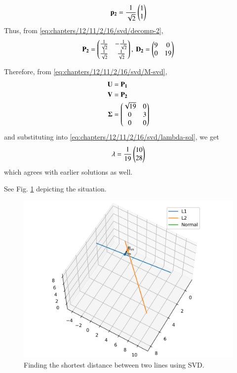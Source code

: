 \begin{enumerate}
        \begin{align}
            \mathbf{p_2} = \frac{1}{\sqrt{2}}\begin{pmatrix}1\\1\end{pmatrix}
        \end{align}
        Thus, from \eqref{eq:chapters/12/11/2/16/svd/decomp-2},
        \begin{align}
            \vec{P_2} = \myvec{\frac{1}{\sqrt{2}}&-\frac{1}{\sqrt{2}}\\\frac{1}{\sqrt{2}}&\frac{1}{\sqrt{2}}},\ \vec{D_2} = \myvec{9&0\\0&19}
            \label{eq:chapters/12/11/2/16/svd/eig-params-2}
        \end{align}
    \end{enumerate}
    Therefore, from \eqref{eq:chapters/12/11/2/16/svd/M-svd},
    \begin{align}
        \mathbf{U} &= \mathbf{P_1} \\ 
        \mathbf{V} &= \mathbf{P_2} \\
        \mathbf{\Sigma} &= \begin{pmatrix}\sqrt{19}&0\\0&3\\0&0\end{pmatrix}
        \label{eq:chapters/12/11/2/16/svd/svd-params}
    \end{align}
    and substituting into \eqref{eq:chapters/12/11/2/16/svd/lambda-sol}, we get
    \begin{align}
        \mathbf{\lambda} = \frac{1}{19}\begin{pmatrix}10\\28\end{pmatrix}
    \end{align}
    which agrees with earlier solutions as well.

    See Fig. \ref{fig:chapters/12/11/2/16/svd/svd} depicting the situation.
    \begin{figure}[!ht]
        \centering
        \includegraphics[width=\columnwidth]{chapters/12/11/2/16/svd/figs/skew_svd.png}
        \caption{Finding the shortest distance between two lines using SVD.}
        \label{fig:chapters/12/11/2/16/svd/svd}
    \end{figure}
